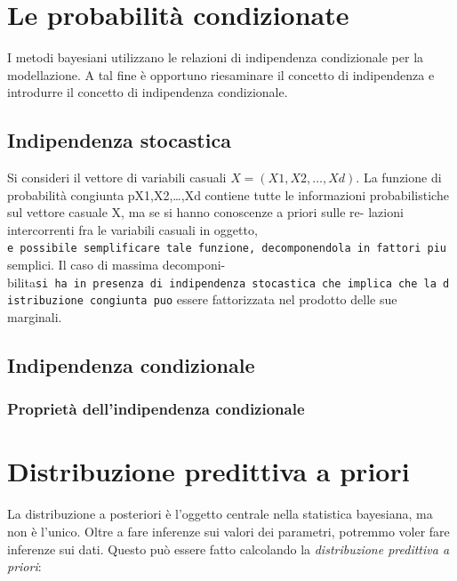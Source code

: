 \documentclass[
  11pt,
]{krantz}
\theoremstyle{definition}
\theoremstyle{definition}
\theoremstyle{definition}
\theoremstyle{definition}
\theoremstyle{remark}
\begin{document}
\hypertarget{le-probabilituxe0-condizionate}{%
\section{Le probabilità condizionate}\label{le-probabilituxe0-condizionate}}

I metodi bayesiani utilizzano le relazioni di indipendenza condizionale per la modellazione. A tal fine è opportuno riesaminare il concetto di indipendenza e introdurre il concetto di indipendenza condizionale.

\hypertarget{indipendenza-stocastica}{%
\subsection{Indipendenza stocastica}\label{indipendenza-stocastica}}

Si consideri il vettore di variabili casuali \(X = (X1, X2, . . . , Xd)\). La funzione di probabilità congiunta pX1,X2,\ldots,Xd contiene tutte le informazioni probabilistiche sul vettore casuale X, ma se si hanno conoscenze a priori sulle re- lazioni intercorrenti fra le variabili casuali in oggetto, \texttt{e\ possibile\ semplificare\ tale\ funzione,\ decomponendola\ in\ fattori\ piu} semplici. Il caso di massima decomponi- bilita\texttt{si\ ha\ in\ presenza\ di\ indipendenza\ stocastica\ che\ implica\ che\ la\ distribuzione\ congiunta\ puo} essere fattorizzata nel prodotto delle sue marginali.

\hypertarget{indipendenza-condizionale-1}{%
\subsection{Indipendenza condizionale}\label{indipendenza-condizionale-1}}

\hypertarget{proprietuxe0-dellindipendenza-condizionale}{%
\subsubsection{Proprietà dell'indipendenza condizionale}\label{proprietuxe0-dellindipendenza-condizionale}}

\hypertarget{distribuzione-predittiva-a-priori}{%
\section{Distribuzione predittiva a priori}\label{distribuzione-predittiva-a-priori}}

La distribuzione a posteriori è l'oggetto centrale nella statistica bayesiana, ma non è l'unico. Oltre a fare inferenze sui valori dei parametri, potremmo voler fare inferenze sui dati. Questo può essere fatto calcolando la \emph{distribuzione predittiva a priori}:
\end{document}
